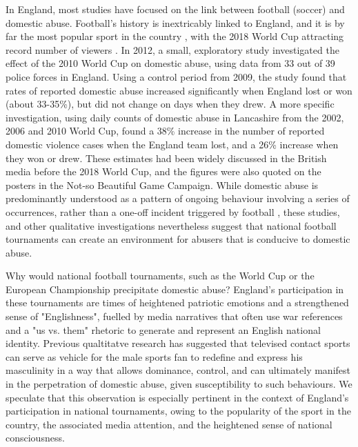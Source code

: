 \documentclass[12pt, letterpaper]{article}
\begin{document}
In England, most studies have focused on the link between football (soccer) and domestic abuse. Football's history is inextricably linked to England, and it is by far the most popular sport in the country \autocite{Parry2014}, with the 2018 World Cup attracting record number of viewers \autocite{BBC}. In 2012, a small, exploratory study investigated the effect of the 2010 World Cup on domestic abuse, using data from 33 out of 39 police forces in England\autocite{Brimicombe2012}. Using a control period from 2009, the study found that rates of reported domestic abuse increased significantly when England lost or won (about 33-35\%), but did not change on days when they drew. A more specific investigation, using daily counts of domestic abuse in Lancashire from the 2002, 2006 and 2010 World Cup, found a 38\% increase in the number of reported domestic violence cases when the England team lost, and a 26\% increase when they won or drew\autocite{Kirby2014}. These estimates had been widely discussed in the British media before the 2018 World Cup, and the figures were also quoted on the posters in the Not-so Beautiful Game Campaign. While domestic abuse is predominantly understood as a pattern of ongoing behaviour involving a series of occurrences, rather than a one-off incident triggered by football \autocite{Brooks-Hay2018}, these studies, and other qualitative investigations\autocite{Swallow} nevertheless suggest that national football tournaments can create an environment for abusers that is conducive to domestic abuse.

Why would national football tournaments, such as the World Cup or the European Championship precipitate domestic abuse? England's participation in these tournaments are times of heightened patriotic emotions and a strengthened sense of "Englishness", fuelled by media narratives that often use war references and a "us vs. them" rhetoric to generate and represent an English national identity\autocite{Vincent2014}. Previous qualtitatve research has suggested that televised contact sports can serve as vehicle for the male sports fan to redefine and express his masculinity in a way that allows dominance, control, and can ultimately manifest in the perpetration of domestic abuse, given susceptibility to such behaviours\autocite{Sabo,Swallow}. We speculate that this observation is especially pertinent in the context of England's participation in national tournaments, owing to the popularity of the sport in the country, the associated media attention, and the heightened sense of national consciousness.
\end{document}
